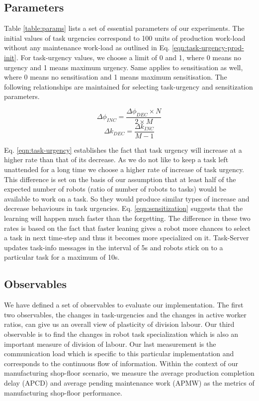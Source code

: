 \documentclass{llncs}
\begin{document}
\subsection{Parameters}
Table \ref{table:params} lists a set of essential parameters of our experiments. The initial values of task urgencies correspond to 100 units of production work-load without any maintenance work-load as outlined in Eq. \ref{eqn:task-urgency-prod-init}. For task-urgency values, we choose a limit of 0 and 1, where 0 means no urgency and 1 means maximum urgency. Same applies to sensitisation as well, where 0 means no sensitisation and 1 means maximum sensitisation. The following relationships are maintained for selecting task-urgency and sensitization parameters.
\begin{small}
\begin{equation}
\Delta\phi_{INC} =  \frac{\Delta\phi_{DEC} \times N}{2 \times M}
\label{eqn:task-urgency}
\end{equation}
%
\begin{equation}
\Delta k_{DEC} = \frac{\Delta k_{INC}} {M - 1} 
\label{eqn:sensitization}
\end{equation}
\end{small}
%
Eq. \ref{eqn:task-urgency} establishes the fact that task urgency will increase at a higher rate than that of its decrease. As we do not like to keep a task left unattended for a long time we choose a higher rate of increase of task urgency. This difference is set on the basis of our assumption that at least half of the expected number of robots (ratio of number of robots to tasks) would be available to work on a task. So they would produce similar types of increase and decrease behaviours in task urgencies.
Eq. \ref{eqn:sensitization} suggests that the learning will happen much faster than the forgetting. The difference in these two rates is based on the fact that faster leaning gives a robot more chances to select  a task in next time-step and thus it becomes more specialized on it.  Task-Server updates task-info messages in the interval of 5s and robots stick on to a particular task for a maximum of 10s.
\subsection{Observables}
We have defined a set of observables to evaluate our implementation. The first two observables, the changes in task-urgencies and the changes in active worker ratios, can give us an overall view of plasticity of division labour. Our third observable is to find the changes in robot task specialization which is also an important measure of division of labour. Our last measurement is the communication load which is specific to this particular implementation and corresponds to the continuous flow of information. Within the context of our manufacturing shop-floor scenario, we measure the average production completion delay (APCD) and average pending maintenance work (APMW) as the metrics of manufacturing shop-floor performance.
% 
\end{document}
